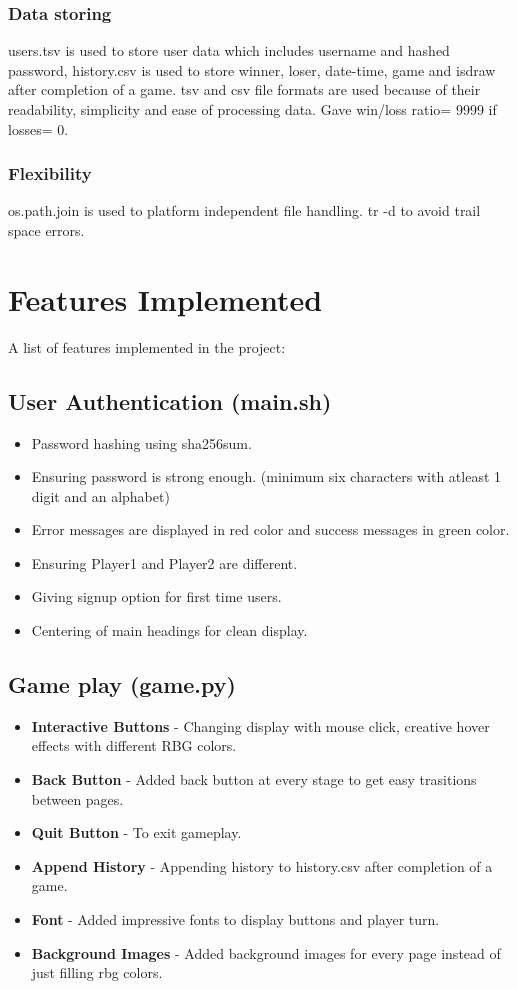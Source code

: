 \documentclass[12pt, letterpaper]{article}
\begin{document}
\subsubsection{Data storing}
users.tsv is used to store user data which includes username and hashed password, history.csv is used to store winner, loser, date-time, game and isdraw after completion of a game.
tsv and csv file formats are used because of their readability, simplicity and ease of processing data. Gave win/loss ratio= 9999 if losses= 0.

\subsubsection{Flexibility}
os.path.join is used to platform independent file handling. tr -d to avoid trail space errors.

\section{Features Implemented}
A list of features implemented in the project:

\subsection{User Authentication (main.sh)}
\begin{itemize}
    \item Password hashing using sha256sum.
    \item Ensuring password is strong enough. (minimum six characters with atleast 1 digit and an alphabet)
    \item Error messages are displayed in red color and success messages in green color.
    \item Ensuring Player1 and Player2 are different.
    \item Giving signup option for first time users.
    \item Centering of main headings for clean display.
\end{itemize}

\subsection{Game play (game.py)}
\begin{itemize}
    \item \textbf{Interactive Buttons} - Changing display with mouse click, creative hover effects with different RBG colors.
    \item \textbf{Back Button} - Added back button at every stage to get easy trasitions between pages.
    \item \textbf{Quit Button} - To exit gameplay.
    \item \textbf{Append History} - Appending history to history.csv after completion of a game.
    \item \textbf{Font} - Added impressive fonts to display buttons and player turn.
    \item \textbf{Background Images} - Added background images for every page instead of just filling rbg colors.
\end{itemize}
\end{document}
